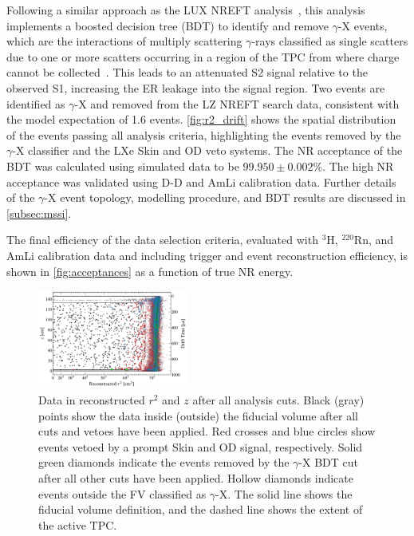 \documentclass[reprint, showpacs,
preprintnumbers,
amsmath,amssymb,
aps, floatfix,
superscriptaddress,
prd, nofootinbib]{revtex4-1}
\begin{document}
Following a similar approach as the LUX NREFT analysis~\cite{LUX:EFTR4_2021}, this analysis implements a boosted decision tree (BDT) to identify and remove $\gamma$-X events, which are the interactions of multiply scattering $\gamma$-rays classified as single scatters due to one or more scatters occurring in a region of the TPC from where charge cannot be collected~\cite{LUX:EFTR4_2021}.
This leads to an attenuated S2 signal relative to the observed S1, increasing the ER leakage into the signal region.
Two events are identified as $\gamma$-X and removed from the LZ NREFT search data, consistent with the model expectation of 1.6 events. 
\autoref{fig:r2_drift} shows the spatial distribution of the events passing all analysis criteria, highlighting the events removed by the $\gamma$-X classifier and the LXe Skin and OD veto systems.
The NR acceptance of the BDT was calculated using simulated data to be $99.950 \pm 0.002$\%.
The high NR acceptance was validated using D-D and AmLi calibration data. 
Further details of the $\gamma$-X event topology, modelling procedure, and BDT results are discussed in \autoref{subsec:mssi}. 
\par
The final efficiency of the data selection criteria, evaluated with ${}^3$H, ${}^{220}$Rn, and AmLi calibration data and including trigger and event reconstruction efficiency, is shown in \autoref{fig:acceptances} as a function of true NR energy.

\begin{figure}[t]
    \centering
    \includegraphics[trim={8 5 5 5},clip, width=0.44\textwidth]{g_paper_rdrift_OD_SKIN}
    \caption{Data in reconstructed $r^2$ and $z$ after all analysis cuts. 
    Black (gray) points show the data inside (outside) the fiducial volume after all cuts and vetoes have been applied.
    Red crosses and blue circles show events vetoed by a prompt Skin and OD signal, respectively.
    Solid green diamonds indicate the events removed by the $\gamma$-X BDT cut after all other cuts have been applied. 
    Hollow diamonds indicate events outside the FV classified as $\gamma$-X.
    The solid line shows the fiducial volume definition, and the dashed line shows the extent of the active TPC.
    }
    \label{fig:r2_drift}
\end{figure}
\end{document}
